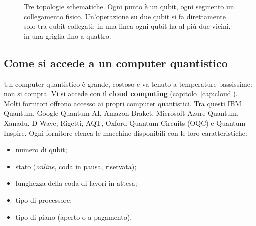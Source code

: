 \begin{figure}[ht]
\centering
{}
\caption{Tre topologie schematiche. Ogni punto è un qubit, ogni segmento un collegamento fisico. Un'operazione su due
qubit si fa direttamente solo tra qubit collegati: in una linea ogni qubit ha al più due vicini, in una griglia fino a
quattro.}
\label{fig:qse-topologie}
\end{figure}

\subsection{Come si accede a un computer quantistico}
\label{sec:qse-accesso}

Un computer quantistico è grande, costoso e va tenuto a temperature bassissime: non si compra. Vi si accede con il
\textbf{cloud computing} (capitolo~\ref{cap:cloud}). Molti fornitori offrono accesso ai propri computer quantistici.
Tra questi IBM Quantum, Google Quantum AI, Amazon Braket, Microsoft Azure Quantum, Xanadu, D-Wave, Rigetti, AQT,
Oxford Quantum Circuits (OQC) e Quantum Inspire. Ogni fornitore elenca le macchine disponibili con le loro
caratteristiche:
\begin{itemize}
  \item numero di qubit;
  \item stato (\emph{online}, coda in pausa, riservata);
  \item lunghezza della coda di lavori in attesa;
  \item tipo di processore;
  \item tipo di piano (aperto o a pagamento).
\end{itemize}

